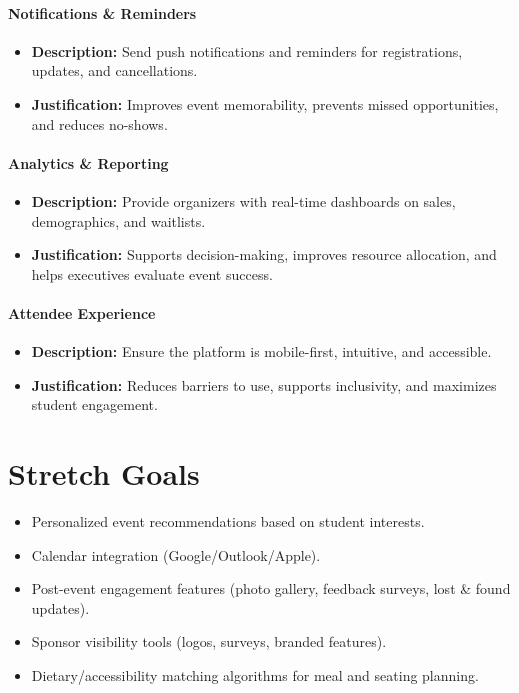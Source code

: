 \documentclass{article}
\begin{document}
\paragraph{Notifications \& Reminders}
\begin{itemize}
    \item \textbf{Description:} Send push notifications and reminders for registrations, updates, and cancellations.
    \item \textbf{Justification:} Improves event memorability, prevents missed opportunities, and reduces no-shows.
\end{itemize}

\paragraph{Analytics \& Reporting}
\begin{itemize}
    \item \textbf{Description:} Provide organizers with real-time dashboards on sales, demographics, and waitlists.
    \item \textbf{Justification:} Supports decision-making, improves resource allocation, and helps executives evaluate event success.
\end{itemize}

\paragraph{Attendee Experience}
\begin{itemize}
    \item \textbf{Description:} Ensure the platform is mobile-first, intuitive, and accessible.
    \item \textbf{Justification:} Reduces barriers to use, supports inclusivity, and maximizes student engagement.
\end{itemize}

\section{Stretch Goals}

\begin{itemize}
    \item Personalized event recommendations based on student interests.
    \item Calendar integration (Google/Outlook/Apple).
    \item Post-event engagement features (photo gallery, feedback surveys, lost \& found updates).
    \item Sponsor visibility tools (logos, surveys, branded features).
    \item Dietary/accessibility matching algorithms for meal and seating planning.
\end{itemize}
\end{document}

